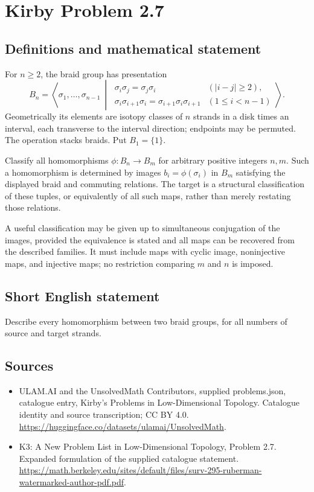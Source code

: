 \documentclass[11pt,a4paper]{article}
\begin{document}
\section*{Kirby Problem 2.7}\label{statement}

\subsection{Definitions and mathematical statement}
For $n\geq2$, the braid group has presentation
\[
B_n=\left\langle\sigma_1,\ldots,\sigma_{n-1}\ \middle|\
\begin{array}{ll}
\sigma_i\sigma_j=\sigma_j\sigma_i&(|i-j|\geq2),\\
\sigma_i\sigma_{i+1}\sigma_i=\sigma_{i+1}\sigma_i\sigma_{i+1}&(1\leq i<n-1)
\end{array}\right\rangle .
\]
Geometrically its elements are isotopy classes of $n$ strands in a disk times
an interval, each transverse to the interval direction; endpoints may be
permuted. The operation stacks braids. Put $B_1=\{1\}$.

Classify all homomorphisms $\phi:B_n\to B_m$ for arbitrary positive integers
$n,m$. Such a homomorphism is determined by images $b_i=\phi(\sigma_i)$ in
$B_m$ satisfying the displayed braid and commuting relations. The target is a
structural classification of these tuples, or equivalently of all such maps,
rather than merely restating those relations.

A useful classification may be given up to simultaneous conjugation of the
images, provided the equivalence is stated and all maps can be recovered from
the described families. It must include maps with cyclic image, noninjective
maps, and injective maps; no restriction comparing $m$ and $n$ is imposed.
\subsection{Short English statement}
Describe every homomorphism between two braid groups, for all numbers of source and target strands.
\subsection{Sources}
\begin{itemize}
\item[S1] ULAM.AI and the UnsolvedMath Contributors, supplied problems.json, catalogue entry, Kirby's Problems in Low-Dimensional Topology. Catalogue identity and source transcription; CC BY 4.0.
\url{https://huggingface.co/datasets/ulamai/UnsolvedMath}.
\item[S2] K3: A New Problem List in Low-Dimensional Topology, Problem 2.7. Expanded formulation of the supplied catalogue statement.
\url{https://math.berkeley.edu/sites/default/files/surv-295-ruberman-watermarked-author-pdf.pdf}.
\end{itemize}
\end{document}
